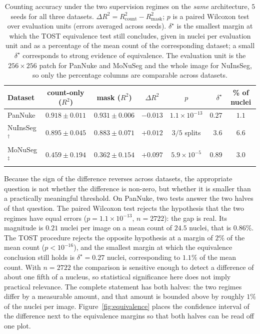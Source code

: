 \documentclass[pdflatex,sn-mathphys-num]{sn-jnl}
\begin{document}
\begin{table}[!htbp]
\centering
\caption{Counting accuracy under the two supervision regimes on the \emph{same} architecture, $5$ seeds for all
three datasets. $\Delta R^2 = R^2_{\text{count}} - R^2_{\text{mask}}$; $p$ is a paired Wilcoxon test over
evaluation units (errors averaged across seeds). $\delta^\star$ is the smallest margin at which the TOST
equivalence test still concludes, given in nuclei per evaluation unit and as a percentage of the mean count of
the corresponding dataset; a small $\delta^\star$ corresponds to strong evidence of equivalence. The evaluation
unit is the $256\times256$ patch for PanNuke and MoNuSeg and the whole image for NuInsSeg, so only the
percentage columns are comparable across datasets.}\label{tab:parity}
\begin{tabular}{@{}lccccrc@{}}
\toprule
Dataset & count-only ($R^2$) & mask ($R^2$) & $\Delta R^2$ & $p$ & $\delta^\star$ & \% of nuclei \\
\midrule
PanNuke & $0.918\pm0.011$ & $0.931\pm0.006$ & $-0.013$ & $1.1{\times}10^{-13}$ & $0.27$ & $1.1$ \\
NuInsSeg$^{\dagger}$ & $0.895\pm0.045$ & $0.883\pm0.071$ & $+0.012$ & $3/5$ splits & $3.6$ & $6.6$ \\
MoNuSeg$^{\ddagger}$ & $0.459\pm0.194$ & $0.362\pm0.154$ & $+0.097$ & $5.9{\times}10^{-5}$ & $0.89$ & $3.0$ \\
\bottomrule
\end{tabular}
\end{table}

Because the sign of the difference reverses across datasets, the appropriate question is not whether the
difference is non-zero, but whether it is smaller than a practically meaningful threshold. On PanNuke, two
tests answer the two halves of that question. The paired Wilcoxon test rejects the hypothesis that the two
regimes have equal errors ($p = 1.1 \times 10^{-13}$, $n = 2722$): the gap is real. Its magnitude is $0.21$
nuclei per image on a mean count of $24.5$ nuclei, that is $0.86\%$. The TOST procedure rejects the opposite
hypothesis at a margin of $2\%$ of the mean count ($p < 10^{-16}$), and the smallest margin at which the
equivalence conclusion still holds is $\delta^\star = 0.27$ nuclei, corresponding to $1.1\%$ of the mean count.
With $n = 2722$ the comparison is sensitive enough to detect a difference of about one fifth of a nucleus, so
statistical significance here does not imply practical relevance. The complete statement has both halves: the
two regimes differ by a measurable amount, and that amount is bounded above by roughly $1\%$ of the nuclei per
image. Figure~\ref{fig:equivalence} places the confidence interval of the difference next to the equivalence
margins so that both halves can be read off one plot.
\end{document}
